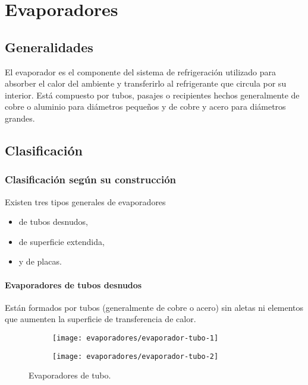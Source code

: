 \chapter{Evaporadores}
\section{Generalidades}


	El evaporador es el componente del sistema de refrigeración utilizado para absorber el calor del ambiente y transferirlo al refrigerante que circula por su interior. Está compuesto por tubos, pasajes o recipientes hechos generalmente de cobre o aluminio para diámetros pequeños y de cobre y acero para diámetros grandes.
	
	
	
	
	\section{Clasificación}
	\subsection{Clasificación según su construcción}
	
		Existen tres tipos generales de evaporadores
		\begin{itemize}
			\item de tubos desnudos,
			\item de superficie extendida,
			\item y de placas.
		\end{itemize}
	
		\subsubsection{Evaporadores de tubos desnudos}
		
			Están formados por tubos (generalmente de cobre o acero) sin aletas ni elementos que aumenten la superficie de transferencia de calor.
			\begin{figure}[h]
				\centering
				\begin{subfigure}{.4\linewidth}
					\texttt{[image: evaporadores/evaporador-tubo-1]}
					
				\end{subfigure}
			\begin{subfigure}{.4\linewidth}
				\texttt{[image: evaporadores/evaporador-tubo-2]}
				
			\end{subfigure}
			\caption{Evaporadores de tubo.}
			\label{fig:evaporadores-tubo}
			\end{figure}
			
